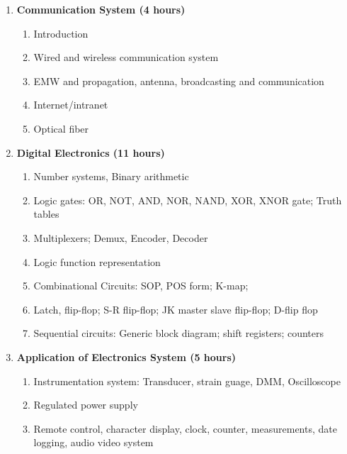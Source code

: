 \begin{enumerate}
\begin{enumerate}
    \end{enumerate}
    
    \item \textbf{Communication System \hfill (4 hours)}
    \begin{enumerate}
        \item Introduction 
        \item Wired and wireless communication system
        \item EMW and propagation, antenna, broadcasting and communication 
        \item Internet/intranet
        \item Optical fiber
    \end{enumerate}
    
    \item \textbf{Digital Electronics \hfill (11 hours)}
    \begin{enumerate}
        \item Number systems, Binary arithmetic
        \item Logic gates: OR, NOT, AND, NOR, NAND, XOR, XNOR gate; Truth tables
        \item Multiplexers; Demux, Encoder, Decoder
        \item Logic function representation
        \item Combinational Circuits: SOP, POS form; K-map;
        \item Latch, flip-flop; S-R flip-flop; JK master slave flip-flop; D-flip flop
        \item Sequential circuits: Generic block diagram; shift registers; counters
    \end{enumerate}
    
    \item \textbf{Application of Electronics System \hfill (5 hours)}
    \begin{enumerate}
        \item Instrumentation system: Transducer, strain guage, DMM, Oscilloscope
        \item Regulated power supply
        \item Remote control, character display, clock, counter, measurements, date logging, audio video system
    \end{enumerate}
\end{enumerate}

